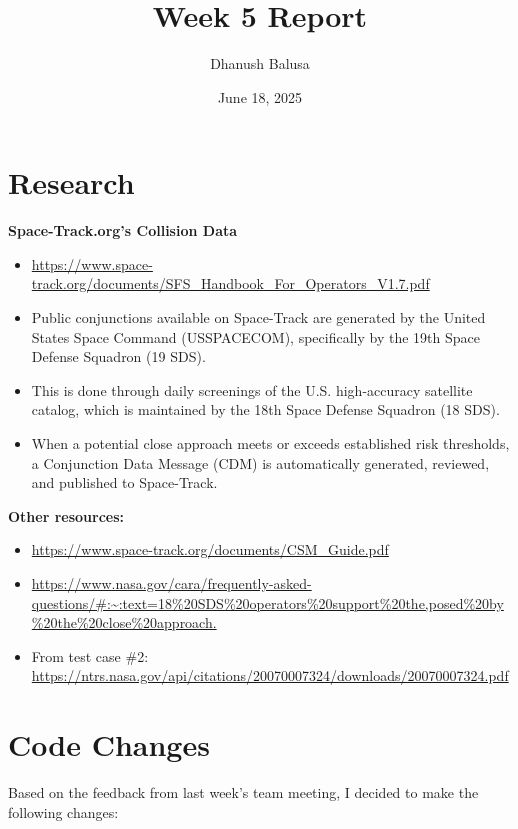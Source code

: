 \documentclass[12pt]{report}
\title{Week 5 Report}
\author{Dhanush Balusa}
\date{June 18, 2025}
\begin{document}
\maketitle

\chapter*{Research}

\textbf{Space-Track.org's Collision Data}
\begin{itemize}
  \item \url{https://www.space-track.org/documents/SFS_Handbook_For_Operators_V1.7.pdf}
  \item Public conjunctions available on Space-Track are generated by the United States Space Command (USSPACECOM), specifically by the 19th Space Defense Squadron (19 SDS).
  \item This is done through daily screenings of the U.S. high-accuracy satellite catalog, which is maintained by the 18th Space Defense Squadron (18 SDS).
  \item When a potential close approach meets or exceeds established risk thresholds, a Conjunction Data Message (CDM) is automatically generated, reviewed, and published to Space-Track.
\end{itemize}

\noindent \textbf{Other resources:}
\begin{itemize}
  \item \url{https://www.space-track.org/documents/CSM_Guide.pdf}
  \item \url{https://www.nasa.gov/cara/frequently-asked-questions/#:~:text=18%20SDS%20operators%20support%20the,posed%20by%20the%20close%20approach.}
  \item From test case \#2: \url{https://ntrs.nasa.gov/api/citations/20070007324/downloads/20070007324.pdf}
\end{itemize}

\chapter*{Code Changes}

Based on the feedback from last week's team meeting, I decided to make the following changes:
\end{document}
